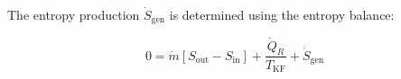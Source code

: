 The entropy production \( \dot{S}_{\text{gen}} \) is determined using the entropy balance:  

\[
0 = \dot{m} \left[ S_{\text{out}} - S_{\text{in}} \right] + \frac{\dot{Q}_R}{T_{\text{KF}}} + \dot{S}_{\text{gen}}
\]
